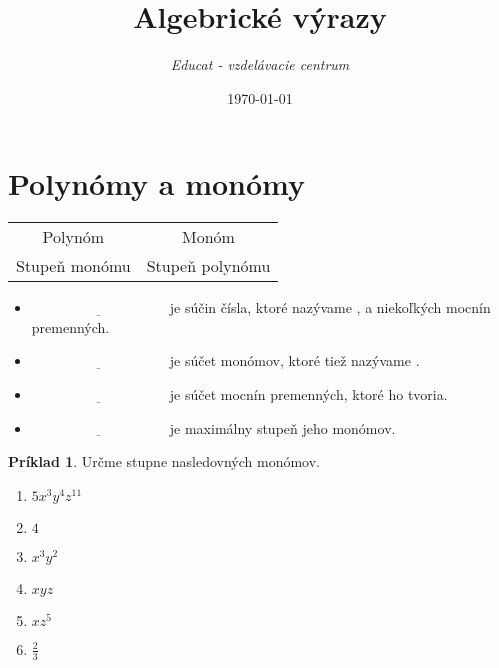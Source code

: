 \documentclass[12pt, twopage]{article}
\title{\textbf{Algebrické výrazy}}
\date{\today}
\author{\textit{Educat - vzdelávacie centrum}}
\theoremstyle{definition}
\newtheorem{example}{Príklad}
\theoremstyle{definition}
\theoremstyle{definition}
\begin{document}
	\maketitle
	
	\section{Polynómy a monómy}
	
	\begin{center}
		\begin{tabular}{|cc|}
			\hline
			Polynóm & Monóm \\
			Stupeň monómu & Stupeň polynómu \\
			\hline
		\end{tabular}
	\end{center}
	
	
	\begin{itemize}
		\item $\underline{\hspace{4cm}}$ je súčin čísla, ktoré nazývame , a niekoľkých mocnín premenných.
		\item $\underline{\hspace{4cm}}$ je súčet monómov, ktoré tiež nazývame .
		\item $\underline{\hspace{4cm}}$ je súčet mocnín premenných, ktoré ho tvoria.
		\item $\underline{\hspace{4cm}}$ je maximálny stupeň jeho monómov.
	\end{itemize}
	
	\begin{example}
		Určme stupne nasledovných monómov.
		
		\begin{enumerate}
			\item $5x^3y^4z^{11}$
			\item $4$
			\item $x^3y^2$
			\item $xyz$
			\item $xz^5$
			\item $\frac{2}{3}$
		\end{enumerate}
	\end{example}
	
\end{document}
